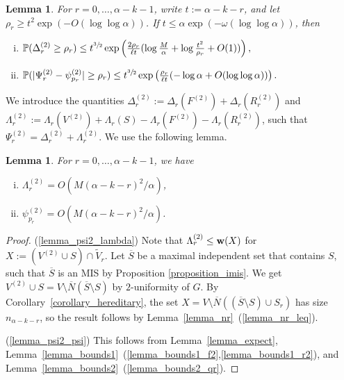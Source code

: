 \documentclass{article}
\theoremstyle{plain}
\theoremstyle{remark}
\theoremstyle{plain}
\newtheorem{lemma}[theorem]{Lemma}
\numberwithin{equation}{section}
\renewcommand{\b}{{\bf{w}}}
\begin{document}
	\begin{lemma}\label{lemma_stronger}
		For $r=0,\ldots,\alpha-k-1$, write $t:=\alpha-k-r$, and let $\rho_r\geq t^2\exp(-O(\log\log\alpha))$. If $t\leq\alpha\exp(-\omega(\log\log\alpha))$, then
		\begin{enumerate}[(i)]
			\item\label{lemma_stronger_delta} $\begin{aligned}[t]
				\mathbb{P}(\Delta_r^{(2)}\geq\rho_r)\leq t^{\sfrac32}\exp\left(\tfrac{2\rho_r}{\ell t}(\log\tfrac{M}{\alpha}+\log\tfrac{t^2}{\rho_r}+O(1))\right),
			\end{aligned}$
			\item\label{lemma_stronger_psi} $\begin{aligned}[t]
				\mathbb{P}(|\Psi_r^{(2)}-\psi_{p_r}^{(2)}|\geq\rho_r)\leq t^{\sfrac32}\exp\left(\tfrac{\rho_r}{\ell t}(-\log\alpha+O(\log\log\alpha))\right).
			\end{aligned}$
		\end{enumerate}
	\end{lemma}
	
	We introduce the quantities $\Delta_r^{(2)}:=\Delta_r(F^{(2)})+\Delta_r(R_r^{(2)})$ and $\Lambda_r^{(2)}:=\Lambda_r(V^{(2)})+\Lambda_r(S)-\Lambda_r(F^{(2)})-\Lambda_r(R_r^{(2)})$, such that $\Psi_r^{(2)}=\Delta_r^{(2)}+\Lambda_r^{(2)}$. We use the following lemma.
	
	\begin{lemma}\label{lemma_psi2}
		For $r=0,\ldots,\alpha-k-1$, we have
		\begin{enumerate}[(i)]
			\item\label{lemma_psi2_lambda} $\Lambda_r^{(2)}=O(M(\alpha-k-r)^2/\alpha)$,
			\item\label{lemma_psi2_psi} $\psi_{p_r}^{(2)}=O(M(\alpha-k-r)^2/\alpha)$.
		\end{enumerate}
	\end{lemma}
	
	\begin{proof}
		(\ref{lemma_psi2_lambda}) Note that $\Lambda_r^{(2)}\leq\b(X)$ for $X:=(V^{(2)}\cup S)\cap\widetilde{V}_r$. Let $\overline{S}$ be a maximal independent set that contains $S$, such that $\overline{S}$ is an MIS by Proposition \ref{proposition_imis}. We get $V^{(2)}\cup S=V\setminus\overline{N}(\overline{S}\setminus S)$ by $2$-uniformity of $G$. By Corollary~\ref{corollary_hereditary}, the set $X=V\setminus\overline{N}((\overline{S}\setminus S)\cup S_r)$ has size $n_{\alpha-k-r}$, so the result follows by Lemma~\ref{lemma_nr}~(\ref{lemma_nr_leq}).
		
		(\ref{lemma_psi2_psi}) This follows from Lemma~\ref{lemma_expect}, Lemma~\ref{lemma_bounds1}~(\ref{lemma_bounds1_f2},\ref{lemma_bounds1_r2}), and Lemma~\ref{lemma_bounds2}~(\ref{lemma_bounds2_qr}).
	\end{proof}
	
\end{document}
